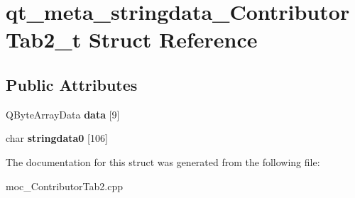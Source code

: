 \hypertarget{structqt__meta__stringdata__ContributorTab2__t}{}\section{qt\+\_\+meta\+\_\+stringdata\+\_\+\+Contributor\+Tab2\+\_\+t Struct Reference}
\label{structqt__meta__stringdata__ContributorTab2__t}
\subsection*{Public Attributes}
\begin{DoxyCompactItemize}
\item 
\mbox{\label{structqt__meta__stringdata__ContributorTab2__t_a54ecc9bf723828e3ada381171e472fd9}} 
Q\+Byte\+Array\+Data {\bfseries data} \mbox{[}9\mbox{]}
\item 
\mbox{\label{structqt__meta__stringdata__ContributorTab2__t_aec0150009a5a461e070dbd8e4dc7e822}} 
char {\bfseries stringdata0} \mbox{[}106\mbox{]}
\end{DoxyCompactItemize}


The documentation for this struct was generated from the following file\+:\begin{DoxyCompactItemize}
\item 
moc\+\_\+\+Contributor\+Tab2.\+cpp\end{DoxyCompactItemize}
